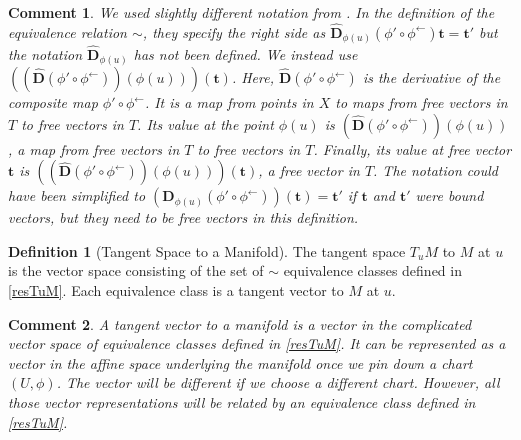 \documentclass[letterpaper,12pt]{article}
\theoremstyle{plain}
\theoremstyle{plain}
\newtheorem*{cmnt*}{Comment}
\theoremstyle{definition}
\newtheorem{defn}{Definition}
\begin{document}
\begin{cmnt*}
We used slightly different notation from \citet{Dodson/Poston:1991}. In the definition of the equivalence relation $\sim$, they specify the right side as $\hat{\mathbf{D}}_{\phi(u)}(\phi' \circ \phi^{\leftarrow})\mathbf{t} = \mathbf{t}'$ but the notation $\hat{\mathbf{D}}_{\phi(u)}$ has not been defined. We instead use
$((\hat{\mathbf{D}}(\phi' \circ \phi^{\leftarrow}))(\phi(u)))(\mathbf{t})$. Here, $\hat{\mathbf{D}}(\phi' \circ \phi^{\leftarrow})$ is the derivative of the composite map $\phi' \circ \phi^{\leftarrow}$. It is a map from points in $X$ to maps from free vectors in $T$ to free vectors in $T$. Its value at the point $\phi(u)$ is $(\hat{\mathbf{D}}(\phi' \circ \phi^{\leftarrow}))(\phi(u))$, a map from free vectors in $T$ to free vectors in $T$. Finally, its value at free vector $\mathbf{t}$ is $((\hat{\mathbf{D}}(\phi' \circ \phi^{\leftarrow}))(\phi(u)))(\mathbf{t})$, a free vector in $T$. The notation could have been simplified to $(\mathbf{D}_{\phi(u)}(\phi' \circ \phi^{\leftarrow}))(\mathbf{t}) = \mathbf{t}'$ if $\mathbf{t}$ and $\mathbf{t}'$ were bound vectors, but they need to be free vectors in this definition.
\end{cmnt*}

\begin{defn}[Tangent Space to a Manifold]\label{defTuM}
The tangent space $T_uM$ to $M$ at $u$ is the vector space consisting of the set of $\sim$ equivalence classes defined in \autoref{resTuM}. Each equivalence class is a tangent vector to $M$ at $u$.
\end{defn}

\begin{cmnt*}
A tangent vector to a manifold is a vector in the complicated vector space of equivalence classes defined in \autoref{resTuM}. It can be represented as a vector in the affine space underlying the manifold once we pin down a chart $(U,\phi)$. The vector will be different if we choose a different chart. However, all those vector representations will be related by an equivalence class defined in \autoref{resTuM}.
\end{cmnt*}
\end{document}
